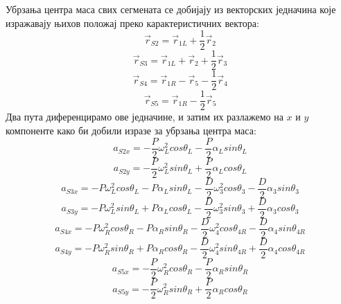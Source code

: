 \documentclass[12pt]{article}
\begin{document}
Убрзања центра маса свих сегмената се добијају из векторских једначина које изражавају њихов положај преко карактеристичних вектора:
\begin{equation}
    \vec{r}_{S2} = \vec{r}_{1L} + \dfrac{1}{2}\vec{r}_2
\end{equation}
\begin{equation}
    \vec{r}_{S3} = \vec{r}_{1L} + \vec{r}_2 + \dfrac{1}{2}\vec{r}_3
\end{equation}
\begin{equation}
    \vec{r}_{S4} = \vec{r}_{1R} - \vec{r}_5 - \dfrac{1}{2}\vec{r}_4
\end{equation}
\begin{equation}
    \vec{r}_{S5} = \vec{r}_{1R} - \dfrac{1}{2}\vec{r}_5
\end{equation}
Два пута диференцирамо ове једначине, и затим их разлажемо на  $x$ и $y$ компоненте како би добили изразе за убрзања центра маса:
\begin{equation}
    a_{S2x} = -\dfrac{P}{2}\omega_L^2cos\theta_L - \dfrac{P}{2}\alpha_Lsin\theta_L
\end{equation}
\begin{equation}
    a_{S2y} = -\dfrac{P}{2}\omega_L^2sin\theta_L + \dfrac{P}{2}\alpha_Lcos\theta_L
\end{equation}
\begin{equation}
    a_{S3x} = -P\omega_L^2cos\theta_L - P\alpha_L sin\theta_L - \dfrac{D}{2}\omega_3^2cos\theta_3 - \dfrac{D}{2}\alpha_3sin\theta_3
\end{equation}
\begin{equation}
    a_{S3y} = -P\omega_L^2sin\theta_L + P\alpha_Lcos\theta_L - \dfrac{D}{2}\omega_3^2sin\theta_3 + \dfrac{D}{2}\alpha_3cos\theta_3
\end{equation}
\begin{equation}
    a_{S4x} = -P\omega_R^2cos\theta_R - P\alpha_R sin\theta_R - \dfrac{D}{2}\omega_4^2cos\theta_{4R} - \dfrac{D}{2}\alpha_4sin\theta_{4R}
\end{equation}
\begin{equation}
    a_{S4y} = -P\omega_R^2sin\theta_R + P\alpha_Rcos\theta_R - \dfrac{D}{2}\omega_4^2sin\theta_{4R} + \dfrac{D}{2}\alpha_4cos\theta_{4R}
\end{equation}
\begin{equation}
    a_{S5x} = -\dfrac{P}{2}\omega_R^2cos\theta_R - \dfrac{P}{2}\alpha_Rsin\theta_R
\end{equation}
\begin{equation}
    a_{S5y} = -\dfrac{P}{2}\omega_R^2sin\theta_R + \dfrac{P}{2}\alpha_Rcos\theta_R
\end{equation}
\end{document}
